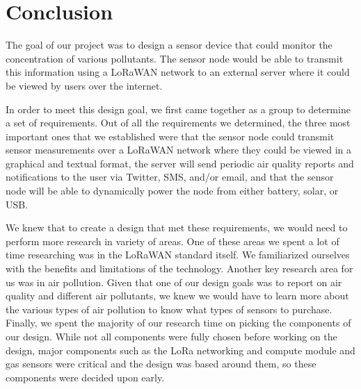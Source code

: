 \section{Conclusion}
The goal of our project was to design a sensor device that could monitor the concentration of various pollutants. The sensor node would be able to transmit this information using a LoRaWAN network to an external server where it could be viewed by users over the internet.

In order to meet this design goal, we first came together as a group to determine a set of requirements. Out of all the requirements we determined, the three most important ones that we established were that the sensor node could transmit sensor measurements over a LoRaWAN network where they could be viewed in a graphical and textual format, the server will send periodic air quality reports and notifications to the user via Twitter, SMS, and/or email, and that the sensor node will be able to dynamically power the node from either battery, solar, or USB. 

We knew that to create a design that met these requirements, we would need to perform more research in variety of areas. One of these areas we spent a lot of time researching was in the LoRaWAN standard itself. We familiarized ourselves with the benefits and limitations of the technology. Another key research area for us was in air pollution. Given that one of our design goals was to report on air quality and different air pollutants, we knew we would have to learn more about the various types of air pollution to know what types of sensors to purchase. Finally, we spent the majority of our research time on picking the components of our design. While not all components were fully chosen before working on the design, major components such as the LoRa networking and compute module and gas sensors were critical and the design was based around them, so these components were decided upon early.



